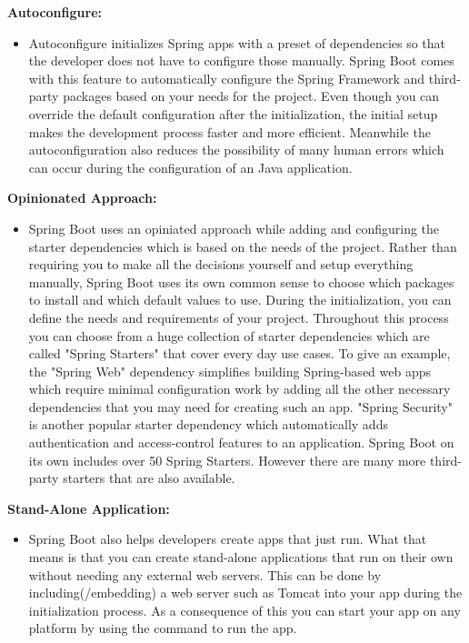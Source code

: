     \textbf{Autoconfigure:}
        \begin{itemize}
            \item Autoconfigure initializes Spring apps with a preset of dependencies so that the developer does not have to configure those manually. Spring Boot comes with this feature to automatically configure the Spring Framework and third-party packages based on your needs for the project. Even though you can override the default configuration
            after the initialization, the initial setup makes the development process faster and more efficient. Meanwhile the autoconfiguration also reduces the possibility of many human errors which can occur during the configuration of an Java application.
        \end{itemize}
    \textbf{Opinionated Approach:}
        \begin{itemize}
            \item Spring Boot uses an opiniated approach while adding and configuring the starter dependencies which is based on the needs of the project. Rather than requiring you to make all the decisions yourself and setup everything manually, Spring Boot uses its own common sense to choose which packages to install and which default values to use.
            During the initialization, you can define the needs and requirements of your project. Throughout this process you can choose from a huge collection of starter dependencies which are called "Spring Starters" that cover every day use cases.
            To give an example, the "Spring Web" dependency simplifies building Spring-based web apps which require minimal configuration work by adding all the other necessary dependencies that you may need for creating such an app. "Spring Security" is another popular starter dependency which automatically adds authentication and access-control
            features to an application.
            Spring Boot on its own includes over 50 Spring Starters. However there are many more third-party starters that are also available.
        \end{itemize}
    \textbf{Stand-Alone Application:}
        \begin{itemize}
            \item Spring Boot also helps developers create apps that just run. What that means is that you can create stand-alone applications that run on their own without needing any external web servers.
            This can be done by including(/embedding) a web server such as Tomcat into your app during the initialization process. As a consequence of this you can start your app on any platform by using the command to run the app.
        \end{itemize}                
    
